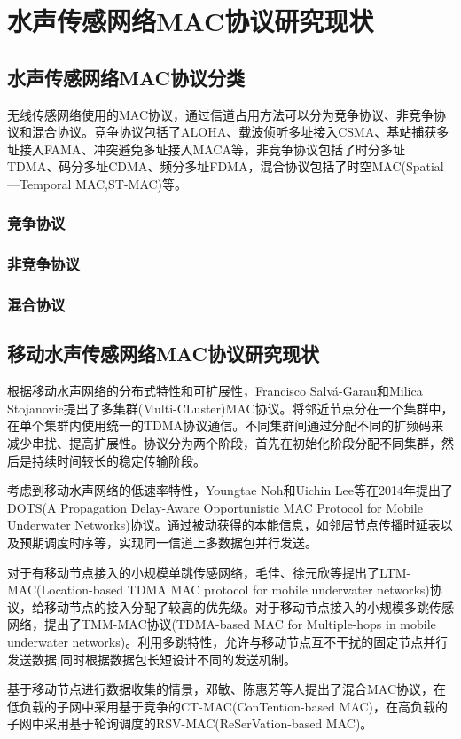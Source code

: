 \chapter{水声传感网络MAC协议研究现状 }
\section{水声传感网络MAC协议分类 }
无线传感网络使用的MAC协议，通过信道占用方法可以分为竞争协议、非竞争协议和混合协议。竞争协议包括了ALOHA、载波侦听多址接入CSMA、基站捕获多址接入FAMA、冲突避免多址接入MACA等，非竞争协议包括了时分多址TDMA、码分多址CDMA、频分多址FDMA，混合协议包括了时空MAC(Spatial—Temporal MAC,ST-MAC)等。
\subsection{竞争协议}
\subsection{非竞争协议}
\subsection{混合协议}
\section{移动水声传感网络MAC协议研究现状}
根据移动水声网络的分布式特性和可扩展性，Francisco Salvá-Garau和Milica Stojanovic提出了多集群(Multi-CLuster)\cite{Multi-Cluster Protocol for Ad Hoc Mobile Underwater Acoustic Networks Oceans2003}MAC协议。将邻近节点分在一个集群中，在单个集群内使用统一的TDMA协议通信。不同集群间通过分配不同的扩频码来减少串扰、提高扩展性。协议分为两个阶段，首先在初始化阶段分配不同集群，然后是持续时间较长的稳定传输阶段。

考虑到移动水声网络的低速率特性，Youngtae Noh和Uichin Lee等在2014年提出了DOTS(A Propagation Delay-Aware Opportunistic MAC Protocol for Mobile Underwater Networks)协议。通过被动获得的本能信息，如邻居节点传播时延表以及预期调度时序等，实现同一信道上多数据包并行发送。\cite{DOTS: A Propagation Delay-Aware Opportunistic MAC Protocol for Mobile Underwater Networks}

对于有移动节点接入的小规模单跳传感网络，毛佳、徐元欣等提出了LTM-MAC(Location-based TDMA MAC protocol for mobile underwater networks)\cite{LTM-MAC: A location-based TDMA MAC protocol for mobile underwater networks}协议，给移动节点的接入分配了较高的优先级。对于移动节点接入的小规模多跳传感网络，提出了TMM-MAC协议(TDMA-based MAC for Multiple-hops in mobile underwater networks)。利用多跳特性，允许与移动节点互不干扰的固定节点并行发送数据,同时根据数据包长短设计不同的发送机制。

基于移动节点进行数据收集的情景，邓敏、陈惠芳等人提出了混合MAC协议\cite{A Hybrid MAC Protocol in Data-collection-oriented
	Underwater Acoustic Sensor Networks}，在低负载的子网中采用基于竞争的CT-MAC(ConTention-based MAC)，在高负载的子网中采用基于轮询调度的RSV-MAC(ReSerVation-based MAC)。



\endinput